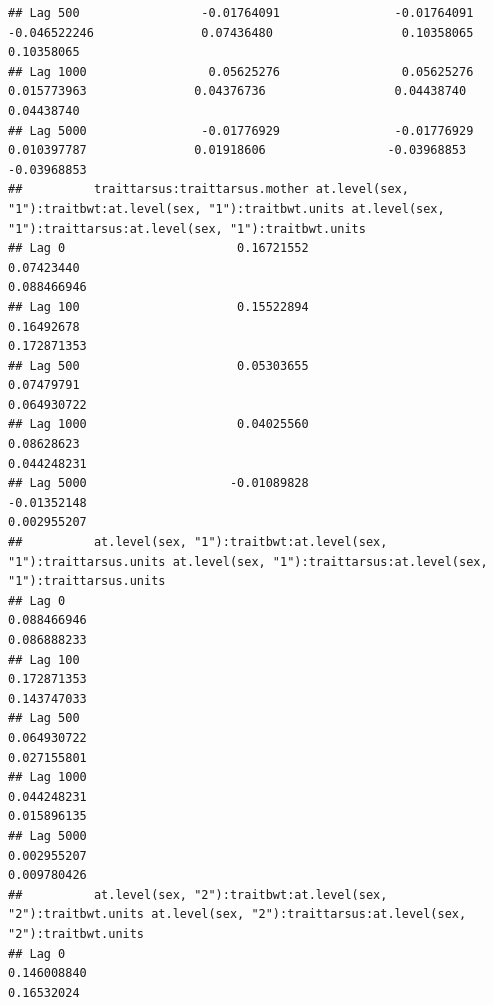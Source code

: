\documentclass[
  12pt,
]{book}
\begin{document}
\begin{verbatim}
## Lag 500                 -0.01764091                -0.01764091                  -0.046522246               0.07436480                  0.10358065                  0.10358065
## Lag 1000                 0.05625276                 0.05625276                   0.015773963               0.04376736                  0.04438740                  0.04438740
## Lag 5000                -0.01776929                -0.01776929                   0.010397787               0.01918606                 -0.03968853                 -0.03968853
##          traittarsus:traittarsus.mother at.level(sex, "1"):traitbwt:at.level(sex, "1"):traitbwt.units at.level(sex, "1"):traittarsus:at.level(sex, "1"):traitbwt.units
## Lag 0                        0.16721552                                                    0.07423440                                                      0.088466946
## Lag 100                      0.15522894                                                    0.16492678                                                      0.172871353
## Lag 500                      0.05303655                                                    0.07479791                                                      0.064930722
## Lag 1000                     0.04025560                                                    0.08628623                                                      0.044248231
## Lag 5000                    -0.01089828                                                   -0.01352148                                                      0.002955207
##          at.level(sex, "1"):traitbwt:at.level(sex, "1"):traittarsus.units at.level(sex, "1"):traittarsus:at.level(sex, "1"):traittarsus.units
## Lag 0                                                         0.088466946                                                         0.086888233
## Lag 100                                                       0.172871353                                                         0.143747033
## Lag 500                                                       0.064930722                                                         0.027155801
## Lag 1000                                                      0.044248231                                                         0.015896135
## Lag 5000                                                      0.002955207                                                         0.009780426
##          at.level(sex, "2"):traitbwt:at.level(sex, "2"):traitbwt.units at.level(sex, "2"):traittarsus:at.level(sex, "2"):traitbwt.units
## Lag 0                                                      0.146008840                                                       0.16532024

\end{verbatim}
\end{document}
